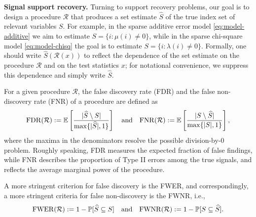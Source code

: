 \medskip

{\bf Signal support recovery.}
Turning to support recovery problems, our goal is to design a procedure $\mathcal R$ that produces a set estimate $\widehat{S}$ of the true index set of relevant variables $S$.
For example, in the sparse additive error model \eqref{eq:model-additive} we aim to estimate $S=\{i:\mu(i)\neq 0\}$, while in the sparse chi-square model \eqref{eq:model-chisq} the goal is to estimate $S=\{i:\lambda(i)\neq 0\}$.
Formally, one should write $\widehat{S}(\mathcal{R}(x))$ to reflect the dependence of the set estimate on the procedure $\mathcal{R}$ and on the test statistics $x$; 
for notational convenience, we suppress this dependence and simply write $\widehat{S}$.

For a given procedure $\mathcal{R}$, the {false discovery rate} (FDR) 
and the {false non-discovery rate} (FNR) of a procedure are defined as
\begin{equation} \label{eq:FDR-FNR}
    \mathrm{FDR}(\mathcal{R}) := \E\left[\frac{|\widehat{S}\setminus S|}{\max\{|\widehat{S}|,1\}}\right]
    \quad \text{and} \quad
    \mathrm{FNR}(\mathcal{R}) := \E\left[\frac{|S\setminus \widehat{S}|}{\max\{|{S}|,1\}}\right],
\end{equation}
where the maxima in the denominators resolve the possible division-by-0 problem. 
Roughly speaking, FDR measures the expected fraction of false findings, while FNR describes the proportion of Type II errors among the true signals, and reflects the average marginal power of the procedure.

A more stringent criterion for false discovery is the \ac{FWER},
and correspondingly, a more stringent criteria for false non-discovery is the \ac{FWNR},
i.e.,
\begin{equation} \label{eq:FWER-FWNR}
    \mathrm{FWER}(\mathcal{R}) := 1 - \P[\widehat{S} \subseteq S]
    \quad \text{and} \quad
    \mathrm{FWNR}(\mathcal{R}) := 1 - \P[S \subseteq \widehat{S}].
\end{equation}

